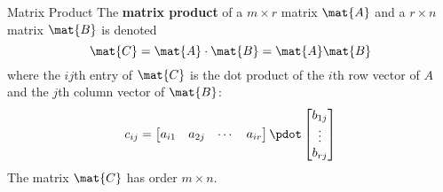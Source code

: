 \documentclass{beamer}
\begin{document}
\begin{frame}
\begin{block}{Matrix Product}
The \textbf{matrix product} of a $m\times r$ matrix $\mat{A}$ and a $r\times n$ matrix $\mat{B}$ is denoted
\begin{equation*}
\mat{C}=\mat{A}\cdot \mat{B}=\mat{A}\mat{B}
\end{equation*}
where the $ij$th entry of $\mat{C}$ is the dot product of the $i$th row vector of $A$ and the $j$th column vector of $\mat{B}$:
\begin{equation*}
\begin{split}
c_{ij}&=\begin{bmatrix}a_{i1}&a_{2j}&\cdots&a_{ir}\end{bmatrix}\pdot
\begin{bmatrix}b_{1j}\\\vdots\\b_{rj}\end{bmatrix}\\
\end{split}
\end{equation*}
The matrix $\mat{C}$ has order $m\times n$.
\end{block}
\end{frame}
\end{document}
